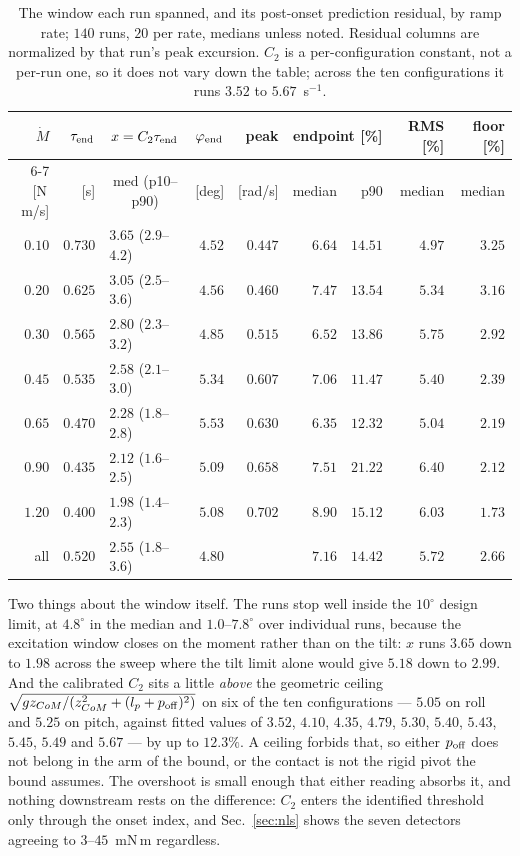 \documentclass[10pt]{article}
\begin{document}
\begin{table}[htbp]
\centering\footnotesize
\caption{The window each run spanned, and its post-onset prediction
residual, by ramp rate; $140$ runs, $20$ per rate, medians unless
noted. Residual columns are normalized by that run's peak excursion.
$C_2$ is a per-configuration constant, not a per-run one, so it does
not vary down the table; across the ten configurations it runs $3.52$
to $5.67$~s$^{-1}$.}
\label{tab:resid}
\begin{tabular}{@{}rrlrrrrrr@{}}
\toprule
$\dot M$ & $\tau_{\rm end}$ & \multicolumn{1}{c}{$x = C_2\tau_{\rm end}$}
 & $\varphi_{\rm end}$ & peak
 & \multicolumn{2}{c}{endpoint [\%]} & RMS [\%] & floor [\%] \\
\cmidrule(lr){6-7}
[N\,m/s] & [s] & \multicolumn{1}{c}{med (p10--p90)} & [deg] & [rad/s]
 & median & p90 & median & median \\
\midrule
$0.10$ & $0.730$ & $3.65$ ($2.9$--$4.2$) & $4.52$ & $0.447$
 & $6.64$ & $14.51$ & $4.97$ & $3.25$\\
$0.20$ & $0.625$ & $3.05$ ($2.5$--$3.6$) & $4.56$ & $0.460$
 & $7.47$ & $13.54$ & $5.34$ & $3.16$\\
$0.30$ & $0.565$ & $2.80$ ($2.3$--$3.2$) & $4.85$ & $0.515$
 & $6.52$ & $13.86$ & $5.75$ & $2.92$\\
$0.45$ & $0.535$ & $2.58$ ($2.1$--$3.0$) & $5.34$ & $0.607$
 & $7.06$ & $11.47$ & $5.40$ & $2.39$\\
$0.65$ & $0.470$ & $2.28$ ($1.8$--$2.8$) & $5.53$ & $0.630$
 & $6.35$ & $12.32$ & $5.04$ & $2.19$\\
$0.90$ & $0.435$ & $2.12$ ($1.6$--$2.5$) & $5.09$ & $0.658$
 & $7.51$ & $21.22$ & $6.40$ & $2.12$\\
$1.20$ & $0.400$ & $1.98$ ($1.4$--$2.3$) & $5.08$ & $0.702$
 & $8.90$ & $15.12$ & $6.03$ & $1.73$\\
\midrule
all & $0.520$ & $2.55$ ($1.8$--$3.6$) & $4.80$ &
 & $7.16$ & $14.42$ & $5.72$ & $2.66$\\
\bottomrule
\end{tabular}
\end{table}

Two things about the window itself. The runs stop well inside the
$10^\circ$ design limit, at $4.8^\circ$ in the median and
$1.0$--$7.8^\circ$ over individual runs, because the excitation window
closes on the moment rather than on the tilt: $x$ runs $3.65$ down to
$1.98$ across the sweep where the tilt limit alone would give $5.18$
down to $2.99$. And the calibrated $C_2$ sits a little \emph{above} the
geometric ceiling
$\sqrt{gz_{CoM}/(z_{CoM}^2+(l_p+p_{\rm off})^2)}$ on six of the ten
configurations — $5.05$ on roll and $5.25$ on pitch, against fitted
values of $3.52$, $4.10$, $4.35$, $4.79$, $5.30$, $5.40$, $5.43$,
$5.45$, $5.49$ and $5.67$ — by up to $12.3\%$. A ceiling forbids that,
so either $p_{\rm off}$ does not belong in the arm of the bound, or the
contact is not the rigid pivot the bound assumes. The overshoot is
small enough that either reading absorbs it, and nothing downstream
rests on the difference: $C_2$ enters the identified threshold only
through the onset index, and Sec.~\ref{sec:nls} shows the seven
detectors agreeing to $3$--$45$~mN\,m regardless.
\end{document}
